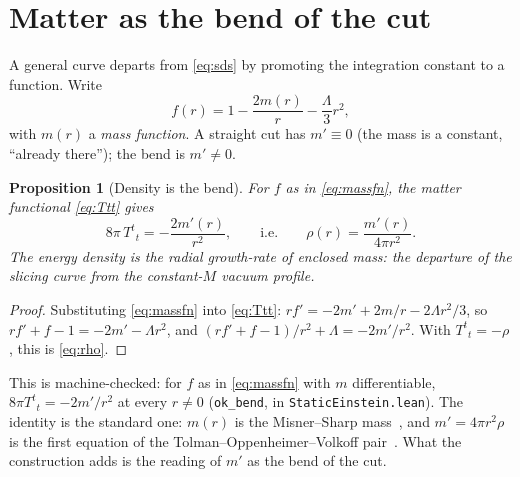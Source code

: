 \documentclass[11pt,a4paper]{article}
\newtheorem{proposition}[theorem]{Proposition}
\theoremstyle{definition}
\newcommand{\Tud}[2]{T^{#1}{}_{#2}}
\begin{document}
\section{Matter as the bend of the cut}\label{sec:bend}

A general curve departs from \eqref{eq:sds} by promoting the integration constant to a function. Write
\begin{equation}\label{eq:massfn}
f(r)=1-\frac{2m(r)}{r}-\frac{\Lambda}{3}r^{2},
\end{equation}
with $m(r)$ a \emph{mass function}. A straight cut has $m'\equiv0$ (the mass is a constant, ``already there''); the bend is $m'\neq0$.

\begin{proposition}[Density is the bend]\label{prop:bend}
For $f$ as in \eqref{eq:massfn}, the matter functional \eqref{eq:Ttt} gives
\begin{equation}\label{eq:rho}
8\pi\,\Tud{t}{t}=-\frac{2m'(r)}{r^{2}},
\qquad\text{i.e.}\qquad
\rho(r)=\frac{m'(r)}{4\pi r^{2}}.
\end{equation}
The energy density is the radial growth-rate of enclosed mass: the departure of the slicing curve from the constant-$M$ vacuum profile.
\end{proposition}

\begin{proof}
Substituting \eqref{eq:massfn} into \eqref{eq:Ttt}: $rf'=-2m'+2m/r-2\Lambda r^{2}/3$, so $rf'+f-1=-2m'-\Lambda r^{2}$, and $(rf'+f-1)/r^{2}+\Lambda=-2m'/r^{2}$. With $\Tud{t}{t}=-\rho$, this is \eqref{eq:rho}.
\end{proof}

This is machine-checked: for $f$ as in \eqref{eq:massfn} with $m$ differentiable, $8\pi\Tud{t}{t}=-2m'/r^{2}$ at every $r\neq0$ (\texttt{ok\_bend}, in \texttt{StaticEinstein.lean}). The identity is the standard one: $m(r)$ is the Misner--Sharp mass~\cite{MisnerSharp1964}, and $m'=4\pi r^{2}\rho$ is the first equation of the Tolman--Oppenheimer--Volkoff pair~\cite{Tolman1939,OppenheimerVolkoff1939}. What the construction adds is the reading of $m'$ as the bend of the cut.
\end{document}
